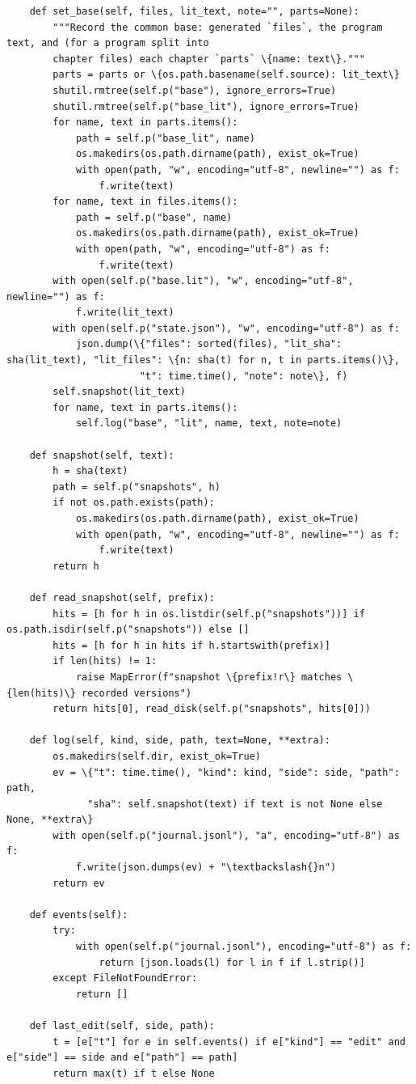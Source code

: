 \documentclass[10pt,a4paper]{article}
\begin{document}
\begin{Verbatim}
    def set_base(self, files, lit_text, note="", parts=None):
        """Record the common base: generated `files`, the program text, and (for a program split into
        chapter files) each chapter `parts` \{name: text\}."""
        parts = parts or \{os.path.basename(self.source): lit_text\}
        shutil.rmtree(self.p("base"), ignore_errors=True)
        shutil.rmtree(self.p("base_lit"), ignore_errors=True)
        for name, text in parts.items():
            path = self.p("base_lit", name)
            os.makedirs(os.path.dirname(path), exist_ok=True)
            with open(path, "w", encoding="utf-8", newline="") as f:
                f.write(text)
        for name, text in files.items():
            path = self.p("base", name)
            os.makedirs(os.path.dirname(path), exist_ok=True)
            with open(path, "w", encoding="utf-8") as f:
                f.write(text)
        with open(self.p("base.lit"), "w", encoding="utf-8", newline="") as f:
            f.write(lit_text)
        with open(self.p("state.json"), "w", encoding="utf-8") as f:
            json.dump(\{"files": sorted(files), "lit_sha": sha(lit_text), "lit_files": \{n: sha(t) for n, t in parts.items()\},
                       "t": time.time(), "note": note\}, f)
        self.snapshot(lit_text)
        for name, text in parts.items():
            self.log("base", "lit", name, text, note=note)

    def snapshot(self, text):
        h = sha(text)
        path = self.p("snapshots", h)
        if not os.path.exists(path):
            os.makedirs(os.path.dirname(path), exist_ok=True)
            with open(path, "w", encoding="utf-8", newline="") as f:
                f.write(text)
        return h

    def read_snapshot(self, prefix):
        hits = [h for h in os.listdir(self.p("snapshots"))] if os.path.isdir(self.p("snapshots")) else []
        hits = [h for h in hits if h.startswith(prefix)]
        if len(hits) != 1:
            raise MapError(f"snapshot \{prefix!r\} matches \{len(hits)\} recorded versions")
        return hits[0], read_disk(self.p("snapshots", hits[0]))

    def log(self, kind, side, path, text=None, **extra):
        os.makedirs(self.dir, exist_ok=True)
        ev = \{"t": time.time(), "kind": kind, "side": side, "path": path,
              "sha": self.snapshot(text) if text is not None else None, **extra\}
        with open(self.p("journal.jsonl"), "a", encoding="utf-8") as f:
            f.write(json.dumps(ev) + "\textbackslash{}n")
        return ev

    def events(self):
        try:
            with open(self.p("journal.jsonl"), encoding="utf-8") as f:
                return [json.loads(l) for l in f if l.strip()]
        except FileNotFoundError:
            return []

    def last_edit(self, side, path):
        t = [e["t"] for e in self.events() if e["kind"] == "edit" and e["side"] == side and e["path"] == path]
        return max(t) if t else None
\end{Verbatim}
\end{document}
